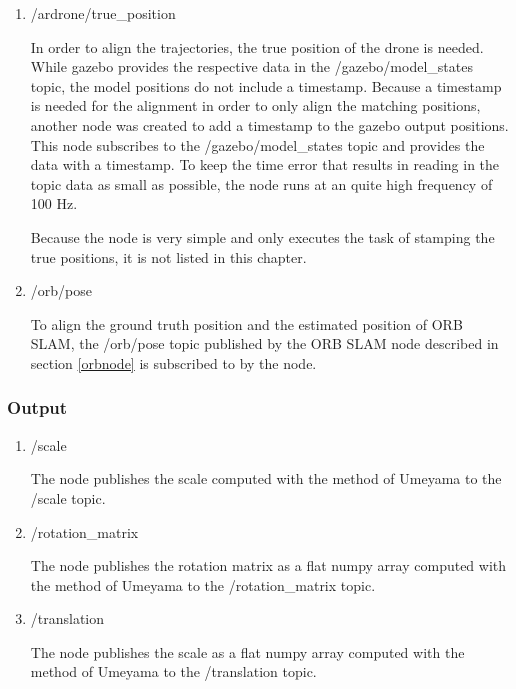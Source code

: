 	\begin{enumerate}
	\item{/ardrone/true\_position}
	
	In order to align the trajectories, the true position of the drone is needed. 
	While gazebo provides the respective data in the /gazebo/model\_states topic, the model 
	positions do not include a timestamp. Because a timestamp is needed for the alignment 
	in order to only align the matching positions, another node was created to add a timestamp 
	to the gazebo output positions. This node subscribes to the /gazebo/model\_states topic 
	and provides the data with a timestamp. To keep the time error that results in reading in 
	the topic data as small as possible, 
	the node runs at an quite high frequency of 100 Hz. 
	
	Because the node is very simple and only executes the task of stamping the true positions, 
	it is not listed in this chapter. 
	
	\item{/orb/pose}
	
	To align the ground truth position and the estimated position of ORB SLAM, the /orb/pose topic published 
	by the ORB SLAM node described in section \ref{orbnode} is subscribed to by the node. 
	
	\end{enumerate}
	
	\subsubsection{Output}
	
	\begin{enumerate}
	\item{/scale}
	
	The node publishes the scale computed with the method of Umeyama to  the /scale topic. 
	
	\item{/rotation\_matrix}
	
	The node publishes the rotation matrix as a flat numpy array computed with the method of Umeyama to  the /rotation\_matrix topic.
	
	\item{/translation}
	
	The node publishes the scale as a flat numpy array computed with the method of Umeyama to  the /translation topic.
	
	\end{enumerate}
	
